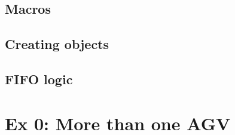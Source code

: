 \subsection{Macros}

\subsection{Creating objects}

\subsection{FIFO logic}


%
\section{Ex 0: More than one AGV}













